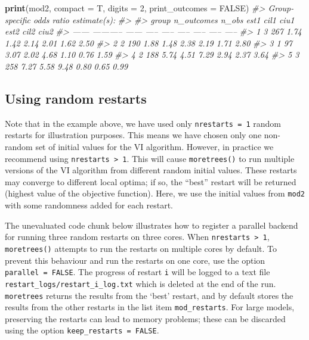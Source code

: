 \documentclass[]{article}
\newenvironment{Shaded}{\begin{snugshade}}{\end{snugshade}}
\newcommand{\CommentTok}[1]{\textcolor[rgb]{0.56,0.35,0.01}{\textit{#1}}}
\newcommand{\DataTypeTok}[1]{\textcolor[rgb]{0.13,0.29,0.53}{#1}}
\newcommand{\DecValTok}[1]{\textcolor[rgb]{0.00,0.00,0.81}{#1}}
\newcommand{\KeywordTok}[1]{\textcolor[rgb]{0.13,0.29,0.53}{\textbf{#1}}}
\newcommand{\NormalTok}[1]{#1}
\newcommand{\OtherTok}[1]{\textcolor[rgb]{0.56,0.35,0.01}{#1}}
\begin{document}
\begin{Shaded}
\begin{Highlighting}[]
\KeywordTok{print}\NormalTok{(mod2, }\DataTypeTok{compact =}\NormalTok{ T, }\DataTypeTok{digits =} \DecValTok{2}\NormalTok{, }\DataTypeTok{print_outcomes =} \OtherTok{FALSE}\NormalTok{)}
\CommentTok{#> Group-specific odds ratio estimate(s):}
\CommentTok{#> }
\CommentTok{#>  group   n_outcomes   n_obs   est1   cil1   ciu1   est2   cil2   ciu2}
\CommentTok{#> ------  -----------  ------  -----  -----  -----  -----  -----  -----}
\CommentTok{#>      1            3     267   1.74   1.42   2.14   2.01   1.62   2.50}
\CommentTok{#>      2            2     190   1.88   1.48   2.38   2.19   1.71   2.80}
\CommentTok{#>      3            1      97   3.07   2.02   4.68   1.10   0.76   1.59}
\CommentTok{#>      4            2     188   5.74   4.51   7.29   2.94   2.37   3.64}
\CommentTok{#>      5            3     258   7.27   5.58   9.48   0.80   0.65   0.99}
\end{Highlighting}
\end{Shaded}

\hypertarget{using-random-restarts}{%
\subsection{Using random restarts}\label{using-random-restarts}}

Note that in the example above, we have used only
\texttt{nrestarts\ =\ 1} random restarts for illustration purposes. This
means we have chosen only one non-random set of initial values for the
VI algorithm. However, in practice we recommend using
\texttt{nrestarts\ \textgreater{}\ 1}. This will cause
\texttt{moretrees()} to run multiple versions of the VI algorithm from
different random initial values. These restarts may converge to
different local optima; if so, the ``best'' restart will be returned
(highest value of the objective function). Here, we use the initial
values from \texttt{mod2} with some randomness added for each restart.

The unevaluated code chunk below illustrates how to register a parallel
backend for running three random restarts on three cores. When
\texttt{nrestarts\ \textgreater{}\ 1}, \texttt{moretrees()} attempts to
run the restarts on multiple cores by default. To prevent this behaviour
and run the restarts on one core, use the option
\texttt{parallel\ =\ FALSE}. The progress of restart \texttt{i} will be
logged to a text file \texttt{restart\_logs/restart\_i\_log.txt} which
is deleted at the end of the run. \texttt{moretrees} returns the results
from the `best' restart, and by default stores the results from the
other restarts in the list item \texttt{mod\_restarts}. For large
models, preserving the restarts can lead to memory problems; these can
be discarded using the option \texttt{keep\_restarts\ =\ FALSE}.
\end{document}
